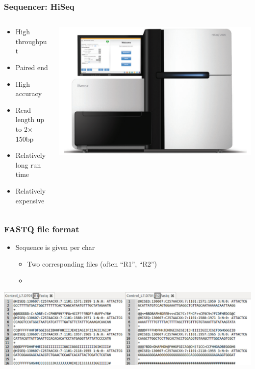 \documentclass{beamer}			  %
\begin{document}
\begin{frame}
\frametitle{Sequencer: HiSeq}
  \begin{columns}[T]
	\begin{column}{.62\textwidth}
	\begin{itemize}
		\item High throughput
		\item Paired end
		\item High accuracy
		\item Read length up to 2$\times$150bp
		\item Relatively long run time
		\item Relatively expensive
	\end{itemize}
	\end{column}
	\begin{column}{.38\textwidth}
		\includegraphics[width=\textwidth]{figures/dge_02p.png}
	\end{column}
  \end{columns}
\end{frame}

\begin{frame}
	\frametitle{FASTQ file format}
	\begin{itemize}
		\item Sequence is given per char
		\begin{itemize}
			\item Two corresponding files (often ``R1”, ``R2”)
			\item[ ] \quad
		\end{itemize}
	\end{itemize}
	\begin{center}
		\includegraphics[width=\textwidth]{figures/dge_03ap.png}
	\end{center}
\end{frame}
\end{document}
